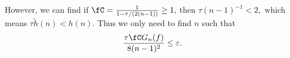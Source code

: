 
%
%
%
%
%

However, we can find if $\fC =\frac{1}{1 - \tau /(2(n-1))} \ge 1,$ then $\tau (n-1)^{-1} <2,$ which means $ \tau\tilde{h}(n)< h(n).$
Thus we only need to find $n$ such that  \[
\frac{\tau \fC G_{n}(f)}{8(n-1)^2} \le \varepsilon.
\]

